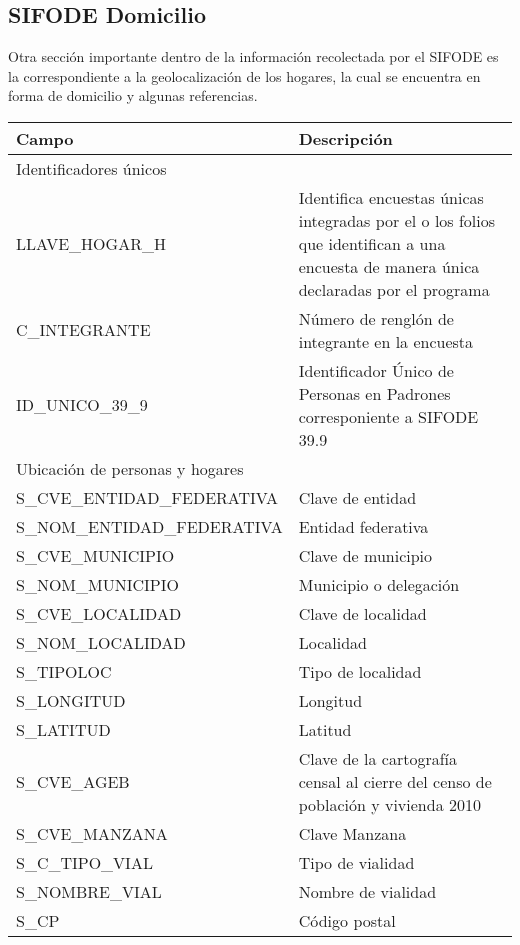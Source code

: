 \subsection{SIFODE Domicilio}
Otra sección importante dentro de la información recolectada por el SIFODE es la correspondiente a la geolocalización de los hogares, la cual se encuentra en forma de domicilio y algunas referencias.

\begin{longtable}{|p{8cm}|p{8cm}|}
    \hline
    \hline
    Campo  & Descripción\\
    \hline
    \hline
    \multicolumn{2}{l}{Identificadores únicos}\\
    \hline
    LLAVE\_HOGAR\_H & Identifica encuestas únicas integradas por el o los folios que identifican a una encuesta de manera única declaradas por el programa\\
    \hline
    C\_INTEGRANTE & Número de renglón de integrante en la encuesta\\
    \hline
    ID\_UNICO\_39\_9 & Identificador Único de Personas en Padrones corresponiente a SIFODE 39.9\\
    \hline
    \hline
    \multicolumn{2}{l}{Ubicación de personas y hogares}\\
    \hline
    S\_CVE\_ENTIDAD\_FEDERATIVA & Clave de entidad \\
    \hline
    S\_NOM\_ENTIDAD\_FEDERATIVA & Entidad federativa \\
    \hline
    S\_CVE\_MUNICIPIO & Clave de municipio\\
    \hline
    S\_NOM\_MUNICIPIO & Municipio o delegación\\
    \hline
    S\_CVE\_LOCALIDAD & Clave de localidad\\
    \hline
    S\_NOM\_LOCALIDAD & Localidad \\
    \hline
    S\_TIPOLOC & Tipo de localidad \\
    \hline
    S\_LONGITUD & Longitud \\
    \hline
    S\_LATITUD & Latitud \\
    \hline
    S\_CVE\_AGEB & Clave de la cartografía censal al cierre del censo de población y vivienda 2010 \\
    \hline
    S\_CVE\_MANZANA & Clave Manzana \\
    \hline
    S\_C\_TIPO\_VIAL & Tipo de vialidad \\
    \hline
    S\_NOMBRE\_VIAL & Nombre de vialidad \\
    \hline
    S\_CP & Código postal \\

\end{longtable}
